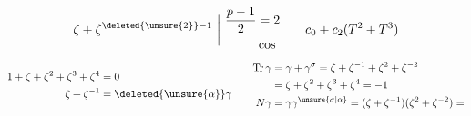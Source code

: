 \[
\zeta+\zeta^{\deleted{\unsure{2}}-1}\ \bigg|\ \begin{aligned}\frac{p-1}{2}&=2\\ &\cos\end{aligned}
\qquad c_0+c_2(T^2+T^3)
\]
\[
\begin{aligned}
1+\zeta+\zeta^2+\zeta^3+\zeta^4&=0\\
\zeta+\zeta^{-1}&=\deleted{\unsure{\alpha}}\gamma
\end{aligned}
\qquad
\begin{aligned}
\operatorname{Tr}\gamma&=\gamma+\gamma^\sigma=\zeta+\zeta^{-1}+\zeta^2+\zeta^{-2}\\
&=\zeta+\zeta^2+\zeta^3+\zeta^4=-1\\
N\gamma&=\gamma\gamma^{\unsure{\sigma|\alpha}}=(\zeta+\zeta^{-1})(\zeta^2+\zeta^{-2})=
\end{aligned}
\]
